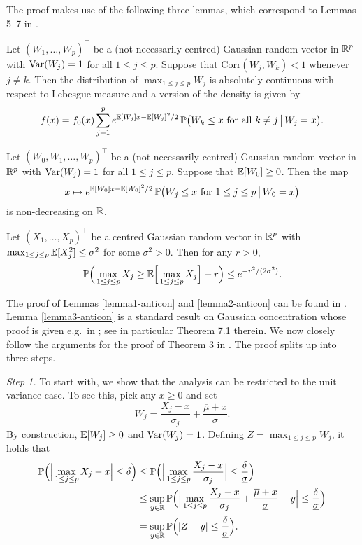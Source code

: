 \documentclass[a4paper,12pt]{article}
\begin{document}
 
The proof makes use of the following three lemmas, which correspond to Lemmas 5--7 in \cite{Chernozhukov2015}. 
\begin{lemmaA}\label{lemma1-anticon}
Let $(W_1,\ldots,W_p)^\top$ be a (not necessarily centred) Gaussian random vector in $\mathbb{R}^p$ with $\textnormal{Var}(W_j) = 1$ for all $1 \le j \le p$. Suppose that $\text{Corr}(W_j,W_k) < 1$ whenever $j \ne k$. Then the distribution of $\max_{1 \le j \le p} W_j$ is absolutely continuous with respect to Lebesgue measure and a version of the density is given by 
\[ f(x) = f_0(x) \sum\limits_{j=1}^p e^{\mathbb{E}[W_j]x - \mathbb{E}[W_j]^2/2} \, \mathbb{P} \big(W_k \le x \text{ for all } k \ne j \, \big| \, W_j = x \big). \]
\end{lemmaA}
\begin{lemmaA}\label{lemma2-anticon}
Let $(W_0,W_1,\ldots,W_p)^\top$ be a (not necessarily centred) Gaussian random vector in $\mathbb{R}^p$ with $\textnormal{Var}(W_j) = 1$ for all $1 \le j \le p$. Suppose that $\mathbb{E}[W_0] \ge 0$. Then the map 
\[ x \mapsto  e^{\mathbb{E}[W_0]x - \mathbb{E}[W_0]^2/2} \, \mathbb{P} \big(W_j \le x \text{ for } 1 \le j \le p \, \big| \, W_0 = x \big) \]
is non-decreasing on $\mathbb{R}$. 
\end{lemmaA}
\begin{lemmaA}\label{lemma3-anticon}
Let $(X_1,\ldots,X_p)^\top$ be a centred Gaussian random vector in $\mathbb{R}^p$ with $\max_{1 \le j \le p} \mathbb{E}[X_j^2] \le \sigma^2$ for some $\sigma^2 > 0$. Then for any $r > 0$, 
\[ \mathbb{P} \Big( \max_{1 \le j \le p} X_j \ge \mathbb{E} \Big[ \max_{1 \le j \le p} X_j \Big] + r \Big) \le e^{-r^2/(2\sigma^2)}. \]
\end{lemmaA} 
The proof of Lemmas \ref{lemma1-anticon} and \ref{lemma2-anticon} can be found in \cite{Chernozhukov2015}. Lemma \ref{lemma3-anticon} is a standard result on Gaussian concentration whose proof is given e.g.\ in \cite{Ledoux2001}; see in particular Theorem 7.1 therein. We now closely follow the arguments for the proof of Theorem 3 in \cite{Chernozhukov2015}. The proof splits up into three steps. 
\vspace{7pt}


\textit{Step 1.} To start with, we show that the analysis can be restricted to the unit variance case. To see this, pick any $x \ge 0$ and set 
\[ W_j = \frac{X_j - x}{\sigma_j} + \frac{\overline{\mu} + x}{\underline{\sigma}}. \]
By construction, $\mathbb{E}[W_j] \ge 0$ and $\textnormal{Var}(W_j) = 1$. Defining $Z = \max_{1 \le j \le p} W_j$, it holds that  
\begin{align*}
\mathbb{P} \Big( \Big| \max_{1 \le j \le p} X_j - x \Big| \le \delta \Big) 
 & \le \mathbb{P} \Big( \Big| \max_{1 \le j \le p} \frac{X_j - x}{\sigma_j} \Big| \le \frac{\delta}{\underline{\sigma}} \Big) \\
 & \le \sup_{y \in \mathbb{R}} \mathbb{P} \Big( \Big| \max_{1 \le j \le p} \frac{X_j - x}{\sigma_j} + \frac{\overline{\mu} + x}{\underline{\sigma}} - y \Big| \le \frac{\delta}{\underline{\sigma}} \Big) \\
 & = \sup_{y \in \mathbb{R}} \mathbb{P} \Big( |Z - y| \le \frac{\delta}{\underline{\sigma}} \Big). 
\end{align*}
\end{document}
